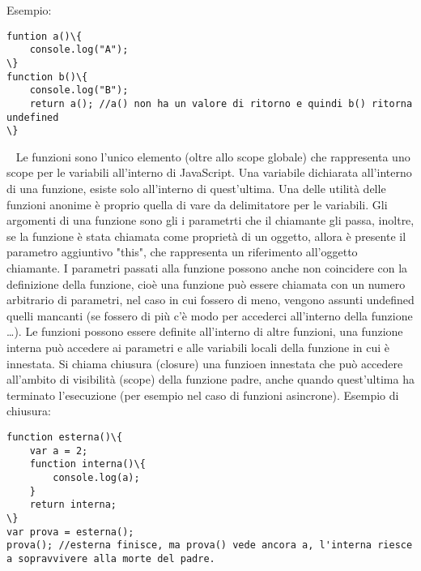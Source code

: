 Esempio:
\begin{lstlisting}
funtion a()\{
    console.log("A");
\}
function b()\{
    console.log("B");
    return a(); //a() non ha un valore di ritorno e quindi b() ritorna undefined
\}
\end{lstlisting}
\ \newline
Le funzioni sono l'unico elemento (oltre allo scope globale) che rappresenta uno scope per le variabili all'interno di JavaScript. Una variabile dichiarata all'interno di una funzione, esiste solo all'interno di quest'ultima.\newline
Una delle utilità delle funzioni anonime è proprio quella di vare da delimitatore per le variabili.\newline
\newline
Gli argomenti di una funzione sono gli i parametrti che il chiamante gli passa, inoltre, se la funzione è stata chiamata come proprietà di un oggetto, allora è presente il parametro aggiuntivo "this", che rappresenta un riferimento all'oggetto chiamante.\newline
I parametri passati alla funzione possono anche non coincidere con la definizione della funzione, cioè una funzione può essere chiamata con un numero arbitrario di parametri, nel caso in cui fossero di meno, vengono assunti undefined quelli mancanti (se fossero di più c'è modo per accederci all'interno della funzione \dots).\newline
\newline
Le funzioni possono essere definite all'interno di altre funzioni, una funzione interna può accedere ai parametri e alle variabili locali della funzione in cui è innestata.\newline
Si chiama chiusura (closure) una funzioen innestata che può accedere all'ambito di visibilità (scope) della funzione padre, anche quando quest'ultima ha terminato l'esecuzione (per esempio nel caso di funzioni asincrone).\newline
Esempio di chiusura:
\begin{lstlisting}
function esterna()\{
    var a = 2;
    function interna()\{
        console.log(a);
    }
    return interna;
\}
var prova = esterna();
prova(); //esterna finisce, ma prova() vede ancora a, l'interna riesce a sopravvivere alla morte del padre.\end{lstlisting}
\ \newline